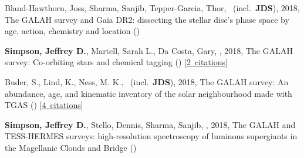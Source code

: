 \item[{\color{numcolor}\scriptsize4}] Bland-Hawthorn, Joss, Sharma, Sanjib, Tepper-Garcia, Thor, \etal\ (incl.\ \textbf{JDS}), 2018, The GALAH survey and Gaia DR2: dissecting the stellar disc's phase space by age, action, chemistry and location ()

\item[{\color{numcolor}\scriptsize3}] \textbf{Simpson, Jeffrey D.}, Martell, Sarah L., Da Costa, Gary, \etal, 2018, The GALAH survey: Co-orbiting stars and chemical tagging () [\href{https://ui.adsabs.harvard.edu/#abs/2018arXiv180405894S}{2~citations}]

\item[{\color{numcolor}\scriptsize2}] Buder, S., Lind, K., Ness, M. K., \etal\ (incl.\ \textbf{JDS}), 2018, The GALAH survey: An abundance, age, and kinematic inventory of the solar neighbourhood made with TGAS () [\href{https://ui.adsabs.harvard.edu/#abs/2018arXiv180405869B}{4~citations}]

\item[{\color{numcolor}\scriptsize1}] \textbf{Simpson, Jeffrey D.}, Stello, Dennis, Sharma, Sanjib, \etal, 2018, The GALAH and TESS-HERMES surveys: high-resolution spectroscopy of luminous supergiants in the Magellanic Clouds and Bridge ()